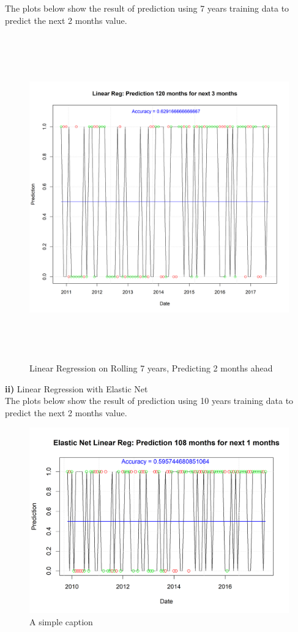 \documentclass[12pt]{amsart}
\begin{document}
The plots below show the result of prediction using 7 years training data to predict the next 2 months value.
\begin{figure}[htb]
	\includegraphics[width=170mm,height=140mm]{IYW_linear_reg_rolling}
	\caption{Linear Regression on Rolling 7 years, Predicting 2 months ahead \label{overflow}}
\end{figure}

\newpage

\textbf{ii)} Linear Regression with Elastic Net\\

The plots below show the result of prediction using 10 years training data to predict the next 2 months value.
\begin{figure}[htb]
	\includegraphics[width=170mm]{IYW_linear_elastic_rolling}
	\caption{A simple caption \label{overflow}}
\end{figure}
\end{document}
